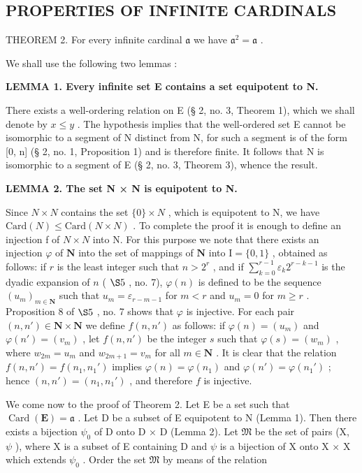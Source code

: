 \subsection{PROPERTIES OF INFINITE CARDINALS}

THEOREM 2. For every infinite cardinal \(\mathfrak{a}\) we have \(\mathfrak{a}^2 = \mathfrak{a}\) .

We shall use the following two lemmas :

\textbf{LEMMA 1. Every infinite set E contains a set equipotent to N.}

There exists a well-ordering relation on E (§ 2, no. 3, Theorem 1), which we shall denote by \(x \leqslant y\) . The hypothesis implies that the well-ordered set E cannot be isomorphic to a segment of N distinct from N, for such a segment is of the form {[}0, n{]} (§ 2, no. 1, Proposition 1) and is therefore finite. It follows that N is isomorphic to a segment of E (§ 2, no. 3, Theorem 3), whence the result.

\textbf{LEMMA 2. The set N × N is equipotent to N.}

Since \(N \times N\) contains the set \(\{0\} \times N\) , which is equipotent to N, we have \(\text{Card}(N) \leqslant \text{Card}(N \times N)\) . To complete the proof it is enough to define an injection f of \(N \times N\) into N. For this purpose we note that there exists an injection \(\varphi\) of \(\mathbf{N}\) into the set of mappings of \(\mathbf{N}\) into \(\mathrm{I} = \{0,1\}\) , obtained as follows: if \(r\) is the least integer such that \(n > 2^r\) , and if \(\sum_{k=0}^{r-1}\varepsilon_k2^{r-k-1}\) is the dyadic expansion of \(n\) ( \(\S 5\) , no. 7), \(\varphi(n)\) is defined to be the sequence \((u_m)_{m\in\mathbf{N}}\) such that \(u_m = \varepsilon_{r-m-1}\) for \(m < r\) and \(u_m = 0\) for \(m \geqslant r\) . Proposition 8 of \(\S 5\) , no. 7 shows that \(\varphi\) is injective. For each pair \((n, n') \in \mathbf{N} \times \mathbf{N}\) we define \(f(n, n')\) as follows: if \(\varphi(n) = (u_m)\) and \(\varphi(n') = (v_m)\) , let \(f(n, n')\) be the integer \(s\) such that \(\varphi(s) = (w_m)\) , where \(w_{2m} = u_m\) and \(w_{2m+1} = v_m\) for all \(m \in \mathbf{N}\) . It is clear that the relation \(f(n, n') = f(n_1, n_1')\) implies \(\varphi(n) = \varphi(n_1)\) and \(\varphi(n') = \varphi(n_1')\) ; hence \((n, n') = (n_1, n_1')\) , and therefore \(f\) is injective.

We come now to the proof of Theorem 2. Let E be a set such that \(\operatorname{Card}(\mathbf{E}) = \mathfrak{a}\) . Let D be a subset of E equipotent to N (Lemma 1). Then there exists a bijection \(\psi_0\) of D onto D × D (Lemma 2). Let \(\mathfrak{M}\) be the set of pairs (X, \(\psi\) ), where X is a subset of E containing D and \(\psi\) is a bijection of X onto X × X which extends \(\psi_0\) . Order the set \(\mathfrak{M}\) by means of the relation


